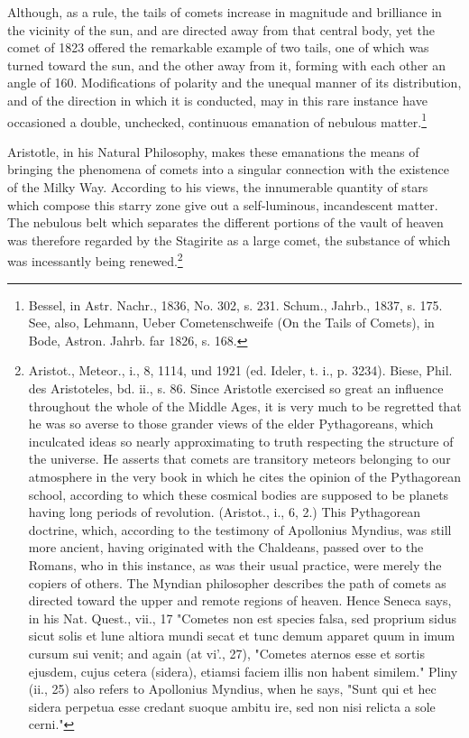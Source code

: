 Although, as a rule, the tails of comets increase in magnitude and brilliance in the vicinity of the sun, and are directed away from that central body, yet the comet of 1823 offered the remarkable example of two tails, one of which was turned toward the sun, and the other away from it, forming with each other an angle of 160. Modifications of polarity and the unequal manner of its distribution, and of the direction in which it is conducted, may in this rare instance have occasioned a double, unchecked, continuous emanation of nebulous matter.\footnote{Bessel, in Astr. Nachr., 1836, No. 302, s. 231. Schum., Jahrb., 1837, s. 175. See, also, Lehmann, Ueber Cometenschweife (On the Tails of Comets), in Bode, Astron. Jahrb. far 1826, s. 168.}

Aristotle, in his Natural Philosophy, makes these emanations the means of bringing the phenomena of comets into a singular connection with the existence of the Milky Way. According to his views, the innumerable quantity of stars which compose this starry zone give out a self-luminous, incandescent matter. The nebulous belt which separates the different portions of the vault of heaven was therefore regarded by the Stagirite as a large comet, the substance of which was incessantly being renewed.\footnote{Aristot., Meteor., i., 8, 1114, und 1921 (ed. Ideler, t. i., p. 3234). Biese, Phil. des Aristoteles, bd. ii., s. 86. Since Aristotle exercised so great an influence throughout the whole of the Middle Ages, it is very much to be regretted that he was so averse to those grander views of the elder Pythagoreans, which inculcated ideas so nearly approximating to truth respecting the structure of the universe. He asserts that comets are transitory meteors belonging to our atmosphere in the very book in which he cites the opinion of the Pythagorean school, according to which these cosmical bodies are supposed to be planets having long periods of revolution. (Aristot., i., 6, 2.) This Pythagorean doctrine, which, according to the testimony of Apollonius Myndius, was still more ancient, having originated with the Chaldeans, passed over to the Romans, who in this instance, as was their usual practice, were merely the copiers of others. The Myndian philosopher describes the path of comets as directed toward the upper and remote regions of heaven. Hence Seneca says, in his Nat. Quest., vii., 17 "Cometes non est species falsa, sed proprium sidus sicut solis et lune altiora mundi secat et tunc demum apparet quum in imum cursum sui venit; and again (at vi'., 27), "Cometes aternos esse et sortis ejusdem, cujus cetera (sidera), etiamsi faciem illis non habent similem." Pliny (ii., 25) also refers to Apollonius Myndius, when he says, "Sunt qui et hec sidera perpetua esse credant suoque ambitu ire, sed non nisi relicta a sole cerni."}


